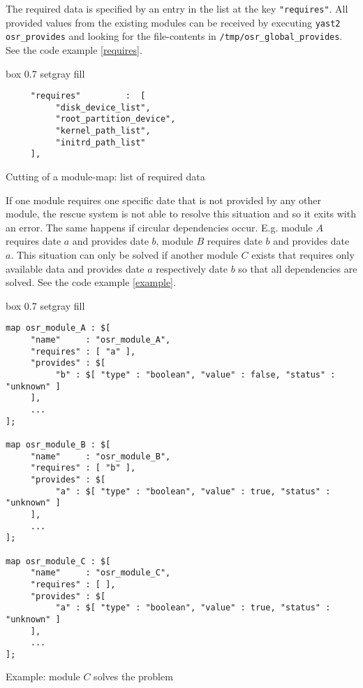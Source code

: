 The required data is specified by an entry in the list at the key
\verb+"requires"+. All provided values from the existing modules can be
received by executing \verb+yast2 osr_provides+ and looking for the
file-contents in \verb+/tmp/osr_global_provides+. See the code example
\ref{requires}.\\

\begin{program}[h!]
\begin{boxitpara}{box 0.7 setgray fill}
{\footnotesize \begin{verbatim}
     "requires"         :  [
          "disk_device_list",
          "root_partition_device",
          "kernel_path_list",
          "initrd_path_list"
     ],
\end{verbatim}}
\end{boxitpara}
\caption{Cutting of a module-map: list of required data}
\label{requires}
\end{program}

If one module requires one specific date that is not provided by any
other module, the rescue system is not able to resolve this situation
and so it exits with an error. The same happens if circular dependencies
occur. E.g. module $A$ requires date $a$ and provides date $b$, module
$B$ requires date $b$ and provides date $a$. This situation can only be
solved if another module $C$ exists that requires only available data
and provides date $a$ respectively date $b$ so that all dependencies
are solved. See the code example \ref{example}.\\

\begin{program}[h!]
\begin{boxitpara}{box 0.7 setgray fill}
{\footnotesize \begin{verbatim}
map osr_module_A : $[
     "name"     : "osr_module_A",
     "requires" : [ "a" ],
     "provides" : $[ 
          "b" : $[ "type" : "boolean", "value" : false, "status" : "unknown" ]
     ],
     ...
];

map osr_module_B : $[
     "name"     : "osr_module_B",
     "requires" : [ "b" ],
     "provides" : $[ 
          "a" : $[ "type" : "boolean", "value" : true, "status" : "unknown" ]
     ],
     ...
];

map osr_module_C : $[
     "name"     : "osr_module_C",
     "requires" : [ ],
     "provides" : $[ 
          "a" : $[ "type" : "boolean", "value" : true, "status" : "unknown" ]
     ],
     ...
];
\end{verbatim}}%
\end{boxitpara}
\caption{Example: module $C$ solves the problem}
\label{example}
\end{program}

